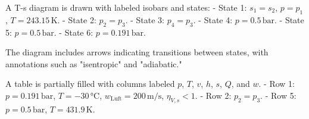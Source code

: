 A T-s diagram is drawn with labeled isobars and states:  
- State 1: \( s_1 = s_2 \), \( p = p_1 \), \( T = 243.15 \, \text{K} \).  
- State 2: \( p_2 = p_3 \).  
- State 3: \( p_4 = p_3 \).  
- State 4: \( p = 0.5 \, \text{bar} \).  
- State 5: \( p = 0.5 \, \text{bar} \).  
- State 6: \( p = 0.191 \, \text{bar} \).  

The diagram includes arrows indicating transitions between states, with annotations such as "isentropic" and "adiabatic."  

A table is partially filled with columns labeled \( p \), \( T \), \( v \), \( h \), \( s \), \( Q \), and \( w \).  
- Row 1: \( p = 0.191 \, \text{bar} \), \( T = -30 \, \text{°C} \), \( w_{\text{Luft}} = 200 \, \text{m/s} \), \( \eta_{V,s} < 1 \).  
- Row 2: \( p_2 = p_3 \).  
- Row 5: \( p = 0.5 \, \text{bar} \), \( T = 431.9 \, \text{K} \).